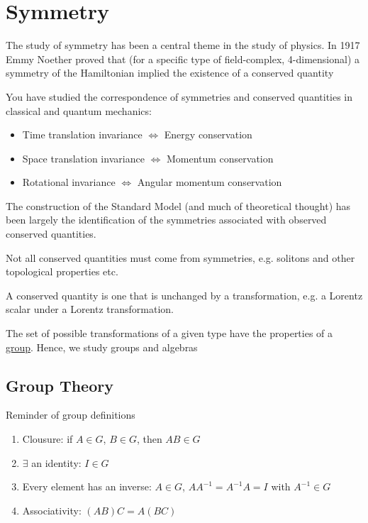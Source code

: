 \newcommand{\up}{\uparrow}
\newcommand{\dn}{\downarrow}
\section{Symmetry}
The study of symmetry has been a central theme in the study of physics. In 1917 Emmy Noether proved that (for a specific type of field-complex, 4-dimensional) a symmetry of the Hamiltonian implied the existence of a conserved quantity

You have studied the correspondence of symmetries and conserved quantities in classical and quantum mechanics:
\begin{itemize}
\item Time translation invariance $\iff$ Energy conservation
\item Space translation invariance $\iff$ Momentum conservation
\item Rotational invariance $\iff$ Angular momentum conservation
\end{itemize}

The construction of the Standard Model (and much of theoretical thought) has been largely the identification of the symmetries associated with observed conserved quantities.

\begin{aside}
  Not all conserved quantities must come from symmetries, e.g. solitons and other topological properties etc.
\end{aside}

A conserved quantity is one that is unchanged by a transformation, e.g. a Lorentz scalar under a Lorentz transformation.

The set of possible transformations of a given type have the properties of a \underline{group}. Hence, we study groups and algebras

\subsection{Group Theory}
Reminder of group definitions
\begin{enumerate}
\item Clousure: if $A\in G$, $B\in G$, then $AB\in G$
\item $\exists$ an identity: $I\in G$
\item Every element has an inverse: $A\in G$, $AA^{-1}=A^{-1}A=I$ with $A^{-1}\in G$
\item Associativity: $(AB)C=A(BC)$
\end{enumerate}


